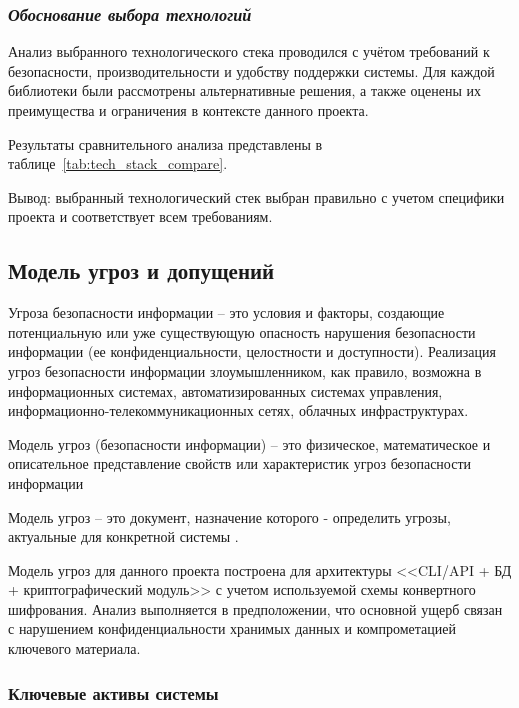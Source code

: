 \documentclass[14pt, a4paper]{extarticle}
\begin{document}
	

	
	\subsubsection*{\textit{Обоснование выбора технологий}}
	
	Анализ выбранного технологического стека проводился с учётом требований к безопасности, производительности и удобству поддержки системы. Для каждой библиотеки были рассмотрены альтернативные решения, а также оценены их преимущества и ограничения в контексте данного проекта.
	
	Результаты сравнительного анализа представлены в таблице~\ref{tab:tech_stack_compare}.
	
	
	
	Вывод: выбранный технологический стек выбран правильно с учетом специфики проекта и соответствует всем требованиям.
	
	\subsection{Модель угроз и допущений}
	
	Угроза безопасности информации -- это условия и факторы, создающие
	потенциальную или уже существующую опасность нарушения безопасности
	информации (ее конфиденциальности, целостности и доступности). Реализация
	угроз безопасности информации злоумышленником, как правило, возможна в
	информационных системах, автоматизированных системах управления,
	информационно-телекоммуникационных сетях, облачных инфраструктурах.
	
	Модель угроз (безопасности информации) -- это физическое,
	математическое и описательное представление свойств или характеристик угроз
	безопасности информации 
	
	Модель угроз -- это документ, назначение которого -
	определить угрозы, актуальные для конкретной системы \cite{Rayovskiy_Metody}.
	
	Модель угроз для данного проекта построена для архитектуры <<CLI/API + БД + криптографический модуль>> с учетом используемой схемы конвертного шифрования. Анализ выполняется в предположении, что основной ущерб связан с нарушением конфиденциальности хранимых данных и компрометацией ключевого материала.
	
	\subsubsection{Ключевые активы системы}
	
\end{document}

